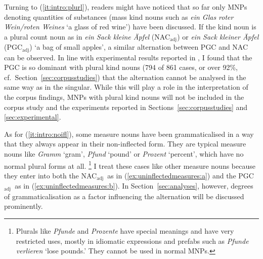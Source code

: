 \documentclass[USenglish]{article}
\newcommand{\Sub}[1]{\ensuremath{\mathrm{_{#1}}}}
\newcommand{\NACa}{NAC\Sub{adj}}
\newcommand{\PGCa}{PGC\Sub{adj}}
\begin{document}
Turning to (\ref{it:intro:plurl}), readers might have noticed that so far only MNPs denoting quantities of substances (mass kind nouns such as \textit{ein Glas roter Wein\slash roten Weines} `a glass of red wine') have been discussed.
If the kind noun is a plural count noun as in \textit{ein Sack kleine Äpfel} (\NACa) or \textit{ein Sack kleiner Äpfel} (\PGCa) `a bag of small apples', a similar alternation between PGC and NAC can be observed.
In line with experimental results reported in \citet[15--16]{Zimmer2015}, I found that the PGC is so dominant with plural kind nouns (794 of 861 cases, or over 92\%, cf.\ Section~\ref{sec:corpusstudies}) that the alternation cannot be analysed in the same way as in the singular.
While this will play a role in the interpretation of the corpus findings, MNPs with plural kind nouns will not be included in the corpus study and the experiments reported in Sections~\ref{sec:corpusstudies} and \ref{sec:experimental}.

As for (\ref{it:intro:noifl}), some measure nouns have been grammaticalised in a way that they always appear in their non-inflected form.
They are typical measure nouns like \textit{Gramm} `gram', \textit{Pfund} `pound' or \textit{Prozent} `percent', which have no normal plural forms at all.%
\footnote{Plurals like \textit{Pfunde} and \textit{Prozente} have special meanings and have very restricted uses, mostly in idiomatic expressions and prefabs such as \textit{Pfunde verlieren} `lose pounds.'
They cannot be used in normal MNPs.}
I treat these cases like other measure nouns because they enter into both the \NACa\ as in (\ref{ex:uninflectedmeasures:a}) and the \PGCa\ as in (\ref{ex:uninflectedmeasures:b}).
In Section~\ref{sec:analyses}, however, degrees of grammaticalisation as a factor influencing the alternation will be discussed prominently.

\begin{exe}
  \ex\label{ex:uninflectedmeasures}
  \begin{xlist}
  \end{xlist}
\end{exe}
\end{document}
